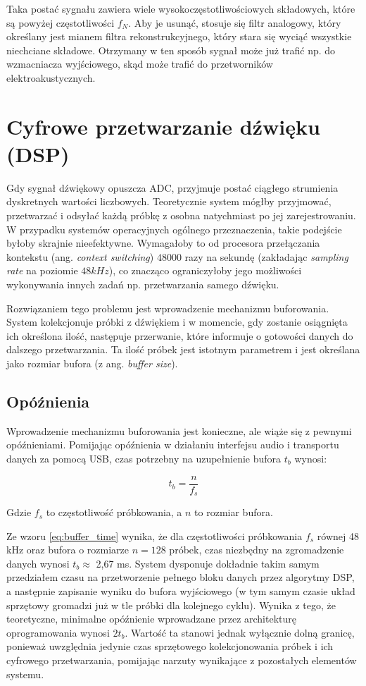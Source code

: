 \documentclass[12pt,a4paper]{report}
\begin{document}
Taka postać sygnału zawiera wiele wysokoczęstotliwościowych
składowych, które są powyżej częstotliwości $f_N$. Aby je
usunąć, stosuje się filtr analogowy, który określany jest mianem
filtra rekonstrukcyjnego, który stara się wyciąć wszystkie niechciane
składowe. Otrzymany w ten sposób sygnał może już trafić np. do
wzmacniacza wyjściowego, skąd może trafić do przetworników elektroakustycznych.

\section{Cyfrowe przetwarzanie dźwięku (DSP)}
Gdy sygnał dźwiękowy opuszcza ADC, przyjmuje postać ciągłego
strumienia dyskretnych wartości liczbowych. Teoretycznie system
mógłby przyjmować, przetwarzać i odsyłać każdą próbkę z osobna
natychmiast po jej zarejestrowaniu. W przypadku systemów operacyjnych
ogólnego przeznaczenia, takie podejście byłoby skrajnie nieefektywne.
Wymagałoby to od procesora przełączania kontekstu (ang.
\textit{context switching}) $48000$ razy na sekundę (zakładając
\textit{sampling rate} na poziomie $48kHz$), co znacząco
ograniczyłoby jego możliwości wykonywania innych zadań np.
przetwarzania samego dźwięku.

Rozwiązaniem tego problemu jest wprowadzenie mechanizmu buforowania.
System kolekcjonuje próbki z dźwiękiem i w momencie, gdy zostanie
osiągnięta ich określona ilość, następuje przerwanie, które informuje
o gotowości danych do dalszego przetwarzania. Ta ilość próbek jest
istotnym parametrem i jest określana jako rozmiar bufora (z ang.
\textit{buffer size}).

\subsection{Opóźnienia}
Wprowadzenie mechanizmu buforowania jest konieczne, ale wiąże się z
pewnymi opóźnieniami. Pomijając opóźnienia w działaniu interfejsu
audio i transportu danych za pomocą USB, czas potrzebny na
uzupełnienie bufora $t_b$ wynosi:

\begin{equation}
  t_b = \frac{n}{f_{s}}
  \label{eq:buffer_time}
\end{equation}

\noindent Gdzie $f_s$ to częstotliwość próbkowania, a $n$ to rozmiar bufora.

Ze wzoru \ref{eq:buffer_time} wynika, że dla częstotliwości
próbkowania $f_s$ równej 48 kHz oraz bufora o rozmiarze $n = 128$
próbek, czas niezbędny na zgromadzenie danych wynosi $t_b \approx$
2,67 ms. System dysponuje dokładnie takim samym przedziałem czasu na
przetworzenie pełnego bloku danych przez algorytmy DSP, a następnie
zapisanie wyniku do bufora wyjściowego (w tym samym czasie układ
sprzętowy gromadzi już w tle próbki dla kolejnego cyklu). Wynika z
tego, że teoretyczne, minimalne opóźnienie wprowadzane przez
architekturę oprogramowania wynosi $2t_b$. Wartość ta stanowi jednak
wyłącznie dolną granicę, ponieważ uwzględnia jedynie czas sprzętowego
kolekcjonowania próbek i ich cyfrowego przetwarzania, pomijając
narzuty wynikające z pozostałych elementów systemu.
\end{document}
